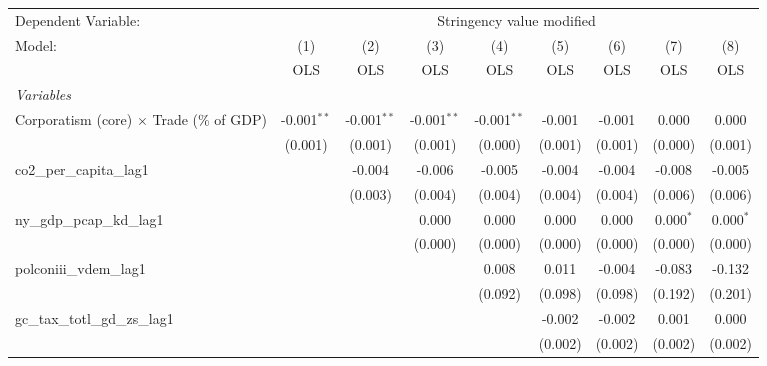 
\begingroup
\centering
\begin{tabular}{lcccccccc}
   \toprule
   Dependent Variable: & \multicolumn{8}{c}{Stringency value modified}\\
   Model:                                          & (1)           & (2)           & (3)           & (4)           & (5)     & (6)     & (7)         & (8)\\  
                                                   &  OLS          & OLS           & OLS           & OLS           & OLS     & OLS     & OLS         & OLS\\  
   \midrule
   \emph{Variables}\\
   Corporatism (core) $\times$ Trade (\% of GDP)   & -0.001$^{**}$ & -0.001$^{**}$ & -0.001$^{**}$ & -0.001$^{**}$ & -0.001  & -0.001  & 0.000       & 0.000\\   
                                                   & (0.001)       & (0.001)       & (0.001)       & (0.000)       & (0.001) & (0.001) & (0.000)     & (0.001)\\   
   co2\_per\_capita\_lag1                          &               & -0.004        & -0.006        & -0.005        & -0.004  & -0.004  & -0.008      & -0.005\\   
                                                   &               & (0.003)       & (0.004)       & (0.004)       & (0.004) & (0.004) & (0.006)     & (0.006)\\   
   ny\_gdp\_pcap\_kd\_lag1                         &               &               & 0.000         & 0.000         & 0.000   & 0.000   & 0.000$^{*}$ & 0.000$^{*}$\\   
                                                   &               &               & (0.000)       & (0.000)       & (0.000) & (0.000) & (0.000)     & (0.000)\\   
   polconiii\_vdem\_lag1                           &               &               &               & 0.008         & 0.011   & -0.004  & -0.083      & -0.132\\   
                                                   &               &               &               & (0.092)       & (0.098) & (0.098) & (0.192)     & (0.201)\\   
   gc\_tax\_totl\_gd\_zs\_lag1                     &               &               &               &               & -0.002  & -0.002  & 0.001       & 0.000\\   
                                                   &               &               &               &               & (0.002) & (0.002) & (0.002)     & (0.002)\\   

\end{tabular}
